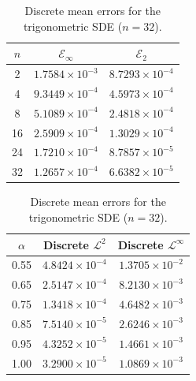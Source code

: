 \documentclass[11pt, a4paper]{article}
\theoremstyle{theoremstyle}
\theoremstyle{definitionstyle}
\begin{document}
\begin{table}[htbp]
    \centering
    \begin{minipage}[t]{0.48\textwidth}
        \centering
        \caption{Trajectory errors for the trigonometric SDE ($\alpha = 1.0$).}
        \label{tab:trig_traj}
        \begin{tabular}{ccc}
            \toprule
            $n$ & $\mathcal E_\infty$ & $\mathcal E_2$ \\
            \midrule
            2  & $1.7584 \times 10^{-3}$ & $8.7293 \times 10^{-4}$ \\
            4  & $9.3449 \times 10^{-4}$ & $4.5973 \times 10^{-4}$ \\
            8  & $5.1089 \times 10^{-4}$ & $2.4818 \times 10^{-4}$ \\
            16 & $2.5909 \times 10^{-4}$ & $1.3029 \times 10^{-4}$ \\
            24 & $1.7210 \times 10^{-4}$ & $8.7857 \times 10^{-5}$ \\
            32 & $1.2657 \times 10^{-4}$ & $6.6382 \times 10^{-5}$ \\
            \bottomrule
        \end{tabular}
    \end{minipage}
    \hfill
    \begin{minipage}[t]{0.48\textwidth}
        \centering
        \caption{Discrete mean errors for the trigonometric SDE ($n = 32$).}
        \label{tab:trig_mean}
        \begin{tabular}{ccc}
            \toprule
            $\alpha$ & Discrete $\mathcal L^2$ & Discrete $\mathcal L^\infty$ \\
            \midrule
            0.55 & $4.8424 \times 10^{-4}$ & $1.3705 \times 10^{-2}$ \\
            0.65 & $2.5147 \times 10^{-4}$ & $8.2130 \times 10^{-3}$ \\
            0.75 & $1.3418 \times 10^{-4}$ & $4.6482 \times 10^{-3}$ \\
            0.85 & $7.5140 \times 10^{-5}$ & $2.6246 \times 10^{-3}$ \\
            0.95 & $4.3252 \times 10^{-5}$ & $1.4661 \times 10^{-3}$ \\
            1.00 & $3.2900 \times 10^{-5}$ & $1.0869 \times 10^{-3}$ \\
            \bottomrule
        \end{tabular}
    \end{minipage}
\end{table}
\end{document}
